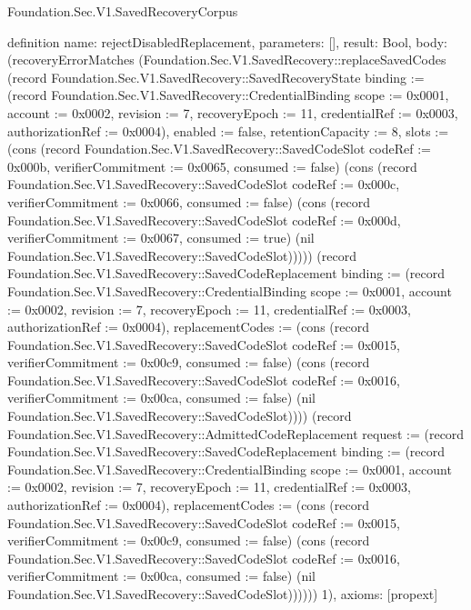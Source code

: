 \begin{lexlean}{Foundation.Sec.V1.SavedRecoveryCorpus}
\begin{semanticmodule}
definition{
  name: rejectDisabledReplacement,
  parameters: [],
  result: Bool,
  body: (recoveryErrorMatches (Foundation.Sec.V1.SavedRecovery::replaceSavedCodes (record Foundation.Sec.V1.SavedRecovery::SavedRecoveryState {binding := (record Foundation.Sec.V1.SavedRecovery::CredentialBinding {scope := 0x0001, account := 0x0002, revision := 7, recoveryEpoch := 11, credentialRef := 0x0003, authorizationRef := 0x0004}), enabled := false, retentionCapacity := 8, slots := (cons (record Foundation.Sec.V1.SavedRecovery::SavedCodeSlot {codeRef := 0x000b, verifierCommitment := 0x0065, consumed := false}) (cons (record Foundation.Sec.V1.SavedRecovery::SavedCodeSlot {codeRef := 0x000c, verifierCommitment := 0x0066, consumed := false}) (cons (record Foundation.Sec.V1.SavedRecovery::SavedCodeSlot {codeRef := 0x000d, verifierCommitment := 0x0067, consumed := true}) (nil Foundation.Sec.V1.SavedRecovery::SavedCodeSlot))))}) (record Foundation.Sec.V1.SavedRecovery::SavedCodeReplacement {binding := (record Foundation.Sec.V1.SavedRecovery::CredentialBinding {scope := 0x0001, account := 0x0002, revision := 7, recoveryEpoch := 11, credentialRef := 0x0003, authorizationRef := 0x0004}), replacementCodes := (cons (record Foundation.Sec.V1.SavedRecovery::SavedCodeSlot {codeRef := 0x0015, verifierCommitment := 0x00c9, consumed := false}) (cons (record Foundation.Sec.V1.SavedRecovery::SavedCodeSlot {codeRef := 0x0016, verifierCommitment := 0x00ca, consumed := false}) (nil Foundation.Sec.V1.SavedRecovery::SavedCodeSlot)))}) (record Foundation.Sec.V1.SavedRecovery::AdmittedCodeReplacement {request := (record Foundation.Sec.V1.SavedRecovery::SavedCodeReplacement {binding := (record Foundation.Sec.V1.SavedRecovery::CredentialBinding {scope := 0x0001, account := 0x0002, revision := 7, recoveryEpoch := 11, credentialRef := 0x0003, authorizationRef := 0x0004}), replacementCodes := (cons (record Foundation.Sec.V1.SavedRecovery::SavedCodeSlot {codeRef := 0x0015, verifierCommitment := 0x00c9, consumed := false}) (cons (record Foundation.Sec.V1.SavedRecovery::SavedCodeSlot {codeRef := 0x0016, verifierCommitment := 0x00ca, consumed := false}) (nil Foundation.Sec.V1.SavedRecovery::SavedCodeSlot)))})})) 1),
  axioms: [propext]
}


\end{semanticmodule}
\end{lexlean}
